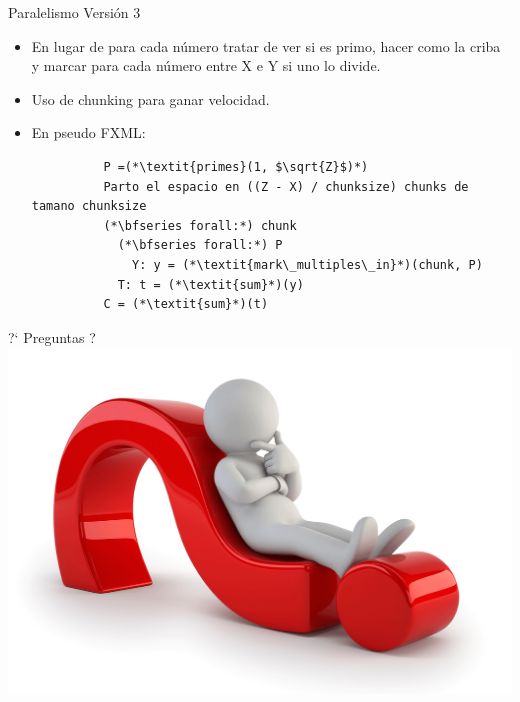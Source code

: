 \documentclass[compress]{beamer}
\begin{document}
\begin{frame}[fragile]{Paralelismo Versión 3}
  \begin{itemize}
    \setlength\itemsep{1em}
    \item<1-> En lugar de para cada número tratar de ver si es primo, hacer como la criba y marcar para cada número entre X e Y si uno lo divide.
    \item<2-> Uso de chunking para ganar velocidad.
    \item<3-> En pseudo FXML:
      \begin{lstlisting}
          P =(*\textit{primes}(1, $\sqrt{Z}$)*)
          Parto el espacio en ((Z - X) / chunksize) chunks de tamano chunksize
          (*\bfseries forall:*) chunk
            (*\bfseries forall:*) P
              Y: y = (*\textit{mark\_multiples\_in}*)(chunk, P)
            T: t = (*\textit{sum}*)(y)
          C = (*\textit{sum}*)(t)
      \end{lstlisting}
  \end{itemize}
\end{frame}
\begin{frame}
  \begin{center}

  {\Huge ?` Preguntas ?}
  \\
  \includegraphics[scale=0.235]{imagenes/preguntas.png}

  \end{center}
\end{frame}
\end{document}
